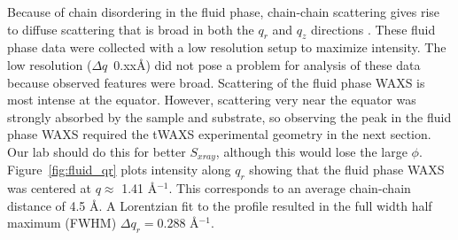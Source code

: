 Because of chain disordering in the fluid phase, chain-chain scattering
gives rise to diffuse scattering that is broad in both the $q_r$ and $q_z$ directions \cite{ref:Mills08}. 
These fluid phase data were collected with a low resolution setup to maximize
intensity. The low resolution (${\Delta}q$~0.xx\AA) did not pose a problem for analysis of these 
data because observed features were broad.  Scattering of the fluid phase WAXS
is most intense at the equator. However, scattering very near the equator
was strongly absorbed by the sample and substrate, so observing the 
peak in the fluid phase WAXS required the tWAXS experimental 
geometry in the next section.  {\jn Our lab should do this for better $S_{xray}$, 
although this would lose the large $\phi$.}
Figure~\ref{fig:fluid_qr} plots intensity along $q_r$ showing that
the fluid phase WAXS was centered at $q \approx$ 1.41 \AA$^{-1}$. 
This corresponds to an average chain-chain distance of 4.5 \AA. 
A Lorentzian fit to the profile resulted in the full width half maximum
(FWHM) $\Delta q_r=0.288$ \AA$^{-1}$.

